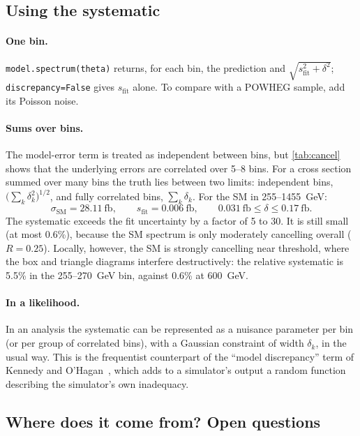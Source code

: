 \documentclass[11pt]{article}
\newcommand{\code}[1]{\texttt{#1}}
\newcommand{\sfit}{s_{\text{fit}}}
\begin{document}
\subsection{Using the systematic}
\label{sec:using_syst}

\paragraph{One bin.} \code{model.spectrum(theta)} returns, for each bin, the prediction and
$\sqrt{\sfit^2 + \delta^2}$; \code{discrepancy=False} gives $\sfit$ alone. To compare with a
POWHEG sample, add its Poisson noise.

\paragraph{Sums over bins.} The model-error term is treated as independent between bins, but
\cref{tab:cancel} shows that the underlying errors are correlated over 5--8 bins. For a
cross section summed over many bins the truth lies between two limits: independent bins,
$\big(\sum_k\delta_k^2\big)^{1/2}$, and fully correlated bins, $\sum_k\delta_k$. For the SM in
255--1455~GeV:
\begin{equation}
  \sigma_{\text{SM}} = 28.11~\text{fb}, \qquad \sfit = 0.006~\text{fb}, \qquad
  0.031~\text{fb} \le \delta \le 0.17~\text{fb} .
\end{equation}
The systematic exceeds the fit uncertainty by a factor of 5 to 30. It is still small (at most
0.6\%), because the SM spectrum is only moderately cancelling overall ($R = 0.25$). Locally,
however, the SM is strongly cancelling near threshold, where the box and triangle diagrams
interfere destructively: the relative systematic is 5.5\% in the 255--270~GeV bin, against
0.6\% at 600~GeV.

\paragraph{In a likelihood.} In an analysis the systematic can be represented as a nuisance
parameter per bin (or per group of correlated bins), with a Gaussian constraint of width
$\delta_k$, in the usual way. This is the frequentist counterpart of the ``model discrepancy''
term of Kennedy and O'Hagan~\cite{kennedyohagan}, which adds to a simulator's output a random
function describing the simulator's own inadequacy.

\subsection{Where does it come from? Open questions}
\label{sec:origin}
\end{document}
